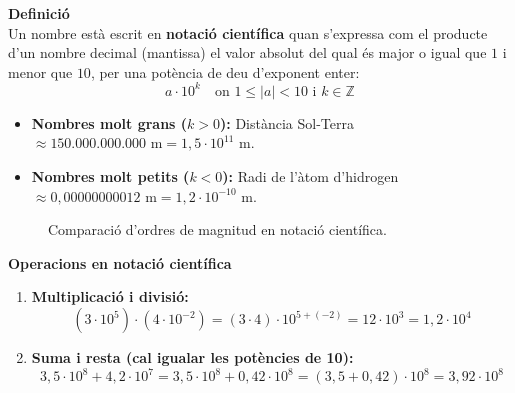 \documentclass[12pt]{article}
\begin{document}
\begin{concept}
\textbf{Definició}\\
Un nombre està escrit en \textbf{notació científica} quan s'expressa com el producte d'un nombre decimal (mantissa) el valor absolut del qual és major o igual que $1$ i menor que $10$, per una potència de deu d'exponent enter:
\[ a \cdot 10^k \quad \text{on } 1 \le |a| < 10 \text{ i } k \in \mathbb{Z} \]

\begin{itemize}
    \item \textbf{Nombres molt grans ($k > 0$):} Distància Sol-Terra $\approx 150.000.000.000 \text{ m} = 1{,}5 \cdot 10^{11} \text{ m}$.
    \item \textbf{Nombres molt petits ($k < 0$):} Radi de l'àtom d'hidrogen $\approx 0{,}00000000012 \text{ m} = 1{,}2 \cdot 10^{-10} \text{ m}$.
\end{itemize}

\begin{figure}[H]
\centering
{}
\caption{Comparació d'ordres de magnitud en notació científica.}
\end{figure}

\end{concept}

\begin{exemple}
\textbf{Operacions en notació científica}
\begin{enumerate}[label=\alph*)]
    \item \textbf{Multiplicació i divisió:}
    \[ (3 \cdot 10^5) \cdot (4 \cdot 10^{-2}) = (3 \cdot 4) \cdot 10^{5 + (-2)} = 12 \cdot 10^3 = 1{,}2 \cdot 10^4 \]
    \item \textbf{Suma i resta (cal igualar les potències de 10):}
    \[ 3{,}5 \cdot 10^8 + 4{,}2 \cdot 10^7 = 3{,}5 \cdot 10^8 + 0{,}42 \cdot 10^8 = (3{,}5 + 0{,}42) \cdot 10^8 = 3{,}92 \cdot 10^8 \]
\end{enumerate}
\end{exemple}
\end{document}
